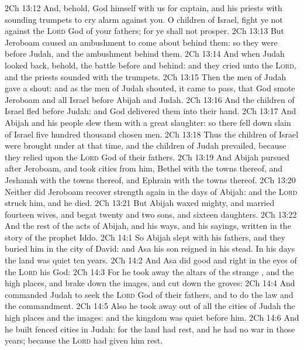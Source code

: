 \vs 2Ch 13:12 And, behold, God himself  with us for  captain, and his priests with sounding trumpets to cry alarm against you. O children of Israel, fight ye not against the \textsc{Lord} God of your fathers; for ye shall not prosper.
\vs 2Ch 13:13 But Jeroboam caused an ambushment to come about behind them: so they were before Judah, and the ambushment  behind them.
\vs 2Ch 13:14 And when Judah looked back, behold, the battle  before and behind: and they cried unto the \textsc{Lord}, and the priests sounded with the trumpets.
\vs 2Ch 13:15 Then the men of Judah gave a shout: and as the men of Judah shouted, it came to pass, that God smote Jeroboam and all Israel before Abijah and Judah.
\vs 2Ch 13:16 And the children of Israel fled before Judah: and God delivered them into their hand.
\vs 2Ch 13:17 And Abijah and his people slew them with a great slaughter: so there fell down slain of Israel five hundred thousand chosen men.
\vs 2Ch 13:18 Thus the children of Israel were brought under at that time, and the children of Judah prevailed, because they relied upon the \textsc{Lord} God of their fathers.
\vs 2Ch 13:19 And Abijah pursued after Jeroboam, and took cities from him, Bethel with the towns thereof, and Jeshanah with the towns thereof, and Ephrain with the towns thereof.
\vs 2Ch 13:20 Neither did Jeroboam recover strength again in the days of Abijah: and the \textsc{Lord} struck him, and he died.
\vs 2Ch 13:21 But Abijah waxed mighty, and married fourteen wives, and begat twenty and two sons, and sixteen daughters.
\vs 2Ch 13:22 And the rest of the acts of Abijah, and his ways, and his sayings,  written in the story of the prophet Iddo.
\vs 2Ch 14:1 So Abijah slept with his fathers, and they buried him in the city of David: and Asa his son reigned in his stead. In his days the land was quiet ten years.
\vs 2Ch 14:2 And Asa did  good and right in the eyes of the \textsc{Lord} his God:
\vs 2Ch 14:3 For he took away the altars of the strange , and the high places, and brake down the images, and cut down the groves:
\vs 2Ch 14:4 And commanded Judah to seek the \textsc{Lord} God of their fathers, and to do the law and the commandment.
\vs 2Ch 14:5 Also he took away out of all the cities of Judah the high places and the images: and the kingdom was quiet before him.
\vs 2Ch 14:6 And he built fenced cities in Judah: for the land had rest, and he had no war in those years; because the \textsc{Lord} had given him rest.
